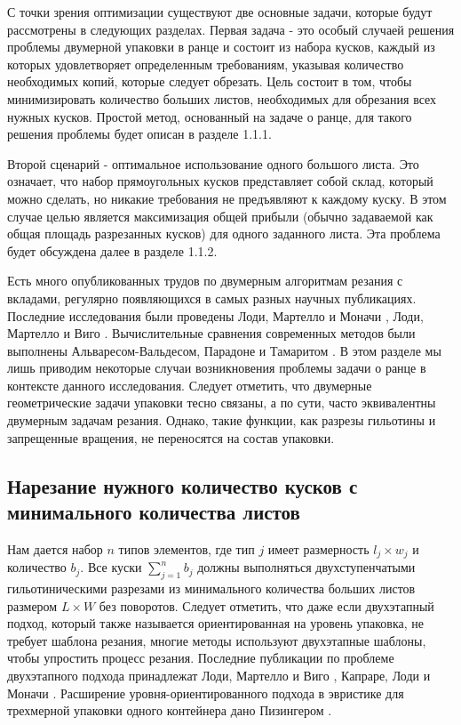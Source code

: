 С точки зрения оптимизации существуют две основные задачи, которые будут рассмотрены в следующих разделах. Первая задача - это особый случаей решения проблемы двумерной упаковки в ранце и состоит из набора кусков, каждый из которых удовлетворяет определенным требованиям, указывая количество необходимых копий, которые следует обрезать. Цель состоит в том, чтобы минимизировать количество больших листов, необходимых для обрезания всех нужных кусков. Простой метод, основанный на задаче о ранце, для такого решения проблемы будет описан в разделе 1.1.1.

Второй сценарий - оптимальное использование одного большого листа. Это означает, что набор прямоугольных кусков представляет собой склад, который можно сделать, но никакие требования не предъявляют к каждому куску. В этом случае целью является максимизация общей прибыли (обычно задаваемой как общая площадь разрезанных кусков) для одного заданного листа. Эта проблема будет обсуждена далее в разделе 1.1.2.

Есть много опубликованных трудов по двумерным алгоритмам резания с вкладами, регулярно появляющихся в самых разных научных публикациях. Последние исследования были проведены Лоди, Мартелло и Моначи \cite{Lodi1}, Лоди, Мартелло и Виго \cite{Lodi2}. Вычислительные сравнения современных методов были выполнены Альваресом-Вальдесом, Парадоне и Тамаритом \cite{Alvarez}. В этом разделе мы лишь приводим некоторые случаи возникновения проблемы задачи о ранце в контексте данного исследования. Следует отметить, что двумерные геометрические задачи упаковки тесно связаны, а по сути, часто эквивалентны двумерным задачам резания. Однако, такие функции, как разрезы гильотины и запрещенные вращения, не переносятся на состав упаковки.

\subsection{Нарезание нужного количество кусков с минимального количества листов}
\label{subsect1_1_1}
Нам дается набор $n$ типов элементов, где тип $j$ имеет размерность $l_j \times w_j$ и количество $b_j$. Все куски $\sum_{j=1}^n b_j$ должны выполняться двухступенчатыми гильотиническими разрезами из минимального количества больших листов размером $L \times W$ без поворотов. Следует отметить, что даже если двухэтапный подход, который также называется ориентированная на уровень упаковка, не требует шаблона резания, многие методы используют двухэтапные шаблоны, чтобы упростить процесс резания. Последние публикации по проблеме двухэтапного подхода принадлежат Лоди, Мартелло и Виго \cite{Lodi3}, Капраре, Лоди и Моначи \cite{Caprara}. Расширение уровня-ориентированного подхода в эвристике для трехмерной упаковки одного контейнера дано Пизингером \cite{Pisiger1}.

